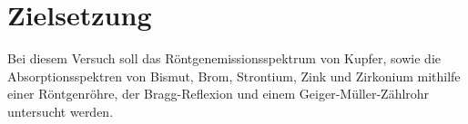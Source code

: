 \section{Zielsetzung}
\label{sec:Zielsetzung}
Bei diesem Versuch soll das Röntgenemissionsspektrum von Kupfer, sowie die Absorptionsspektren von Bismut, Brom, Strontium, Zink und Zirkonium mithilfe
einer Röntgenröhre, der Bragg-Reflexion und einem Geiger-Müller-Zählrohr untersucht werden. 
